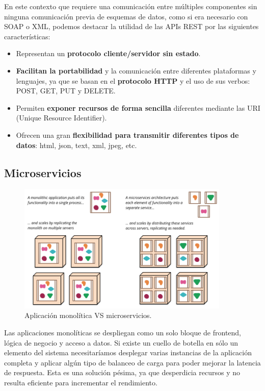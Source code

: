 En este contexto que requiere una comunicación entre múltiples componentes sin ninguna comunicación previa de esquemas de datos, como si era necesario con SOAP o XML, podemos destacar la utilidad de las APIs REST por las siguientes características:

\begin{itemize}
\item Representan un \textbf{protocolo cliente/servidor sin estado}.
\item \textbf{ Facilitan la portabilidad} y la comunicación entre diferentes plataformas y lenguajes, ya que se basan en el \textbf{protocolo HTTP} y el uso de sus verbos: POST, GET, PUT y DELETE.
\item Permiten \textbf{exponer recursos de forma sencilla} diferentes  mediante las URI (Unique Resource Identifier).
\item Ofrecen una gran \textbf{flexibilidad para transmitir diferentes tipos de datos}: html, json, text, xml, jpeg, etc.
\end{itemize}

\subsection{Microservicios}
\begin{figure}
\centering
\includegraphics[width=0.9\textwidth]{sketch.png}
\caption{\label{fig:msv}Aplicación monolítica VS microservicios.}
\end{figure}

Las aplicaciones monolíticas se despliegan como un solo bloque de frontend, lógica de negocio y acceso a datos. Si existe un cuello de botella en sólo un elemento del sistema necesitaríamos desplegar varias instancias de la aplicación completa y aplicar algún tipo de balanceo de carga para poder mejorar la latencia de respuesta. Esta es una solución pésima, ya que desperdicia recursos y no resulta eficiente para incrementar el rendimiento.

